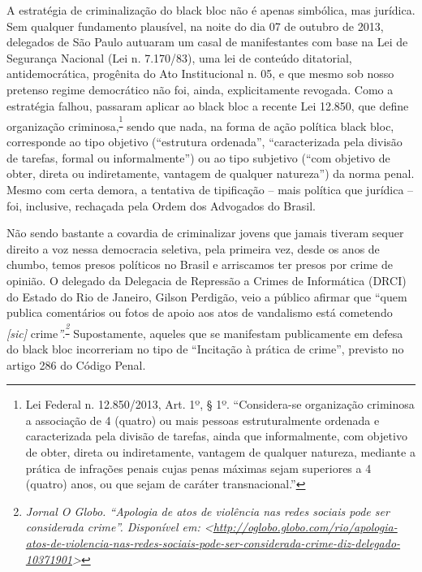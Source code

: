 A estratégia de criminalização do black bloc não é apenas simbólica, mas
jurídica. Sem qualquer fundamento plausível, na noite do dia 07 de
outubro de 2013, delegados de São Paulo autuaram um casal de
manifestantes com base na Lei de Segurança Nacional (Lei n. 7.170/83),
uma lei de conteúdo ditatorial, antidemocrática, progênita do Ato
Institucional n. 05, e que mesmo sob nosso pretenso regime democrático
não foi, ainda, explicitamente revogada. Como a estratégia falhou,
passaram aplicar ao black bloc a recente Lei 12.850, que define
organização criminosa,\textsuperscript{\footnote{Lei Federal n.
  12.850/2013, Art. 1º, § 1º. ``Considera-se organização criminosa a
  associação de 4 (quatro) ou mais pessoas estruturalmente ordenada e
  caracterizada pela divisão de tarefas, ainda que informalmente, com
  objetivo de obter, direta ou indiretamente, vantagem de qualquer
  natureza, mediante a prática de infrações penais cujas penas máximas
  sejam superiores a 4 (quatro) anos, ou que sejam de caráter
  transnacional.''}} sendo que nada, na forma de ação política black
bloc, corresponde ao tipo objetivo (``estrutura ordenada'',
``caracterizada pela divisão de tarefas, formal ou informalmente'') ou
ao tipo subjetivo (``com objetivo de obter, direta ou indiretamente,
vantagem de qualquer natureza'') da norma penal. Mesmo com certa demora,
a tentativa de tipificação -- mais política que jurídica -- foi,
inclusive, rechaçada pela Ordem dos Advogados do Brasil.

Não sendo bastante a covardia de criminalizar jovens que jamais tiveram
sequer direito a voz nessa democracia seletiva, pela primeira vez, desde
os anos de chumbo, temos presos políticos no Brasil e arriscamos ter
presos por crime de opinião. O delegado da Delegacia de Repressão a
Crimes de Informática (DRCI) do Estado do Rio de Janeiro, Gilson
Perdigão, veio a público afirmar que ``quem publica comentários ou fotos
de apoio aos atos de vandalismo está cometendo \emph{{[}sic{]}
}crime\emph{''.}\textsuperscript{\emph{\footnote{\emph{ Jornal O Globo.
  ``Apologia de atos de violência nas redes sociais pode ser considerada
  crime''. Disponível em:
  \textless{}}\href{http://oglobo.globo.com/rio/apologia-atos-de-violencia-nas-redes-sociais-pode-ser-considerada-crime-diz-delegado-10371901}{\emph{http://oglobo.globo.com/rio/apologia-atos-de-violencia-nas-redes-sociais-pode-ser-considerada-crime-diz-delegado-10371901}}\emph{\textgreater{}}}}}\emph{
}Supostamente, aqueles que se manifestam publicamente em defesa do black
bloc incorreriam no tipo de ``Incitação à prática de crime'', previsto
no artigo 286 do Código Penal.


